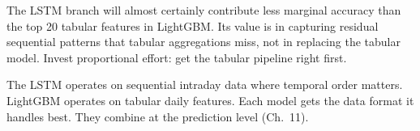\begin{warning}
The LSTM branch will almost certainly contribute less marginal accuracy than the top 20 tabular features in LightGBM.
Its value is in capturing residual sequential patterns that tabular aggregations miss, not in replacing the tabular model.
Invest proportional effort: get the tabular pipeline right first.
\end{warning}

\begin{keyidea}
The LSTM operates on sequential intraday data where temporal order matters.
LightGBM operates on tabular daily features.
Each model gets the data format it handles best.
They combine at the prediction level (Ch.~11).
\end{keyidea}
